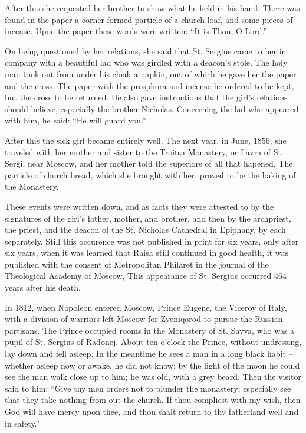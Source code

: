 After this she requested her brother to show what he held in his hand. There was found in the paper a corner-formed particle of a church loaf, and some pieces of incense. Upon the paper these words were written: ``It is Thou, O Lord.''

On being questioned by her relations, she said that St. Sergius came to her in company with a beautiful lad who was girdled with a deacon's stole. The holy man took out from under his cloak a napkin, out of which he gave her the paper and the cross. The paper with the prosphora and incense he ordered to be kept, but the cross to be returned. He also gave instructions that the girl's relations should believe, especially the brother Nicholas. Concerning the lad who appeared with him, he said: ``He will guard you.''

After this the sick girl became entirely well. The next year, in June, 1856, she traveled with her mother and sister to the Troitsa Monastery, or Lavra of St. Sergi, near Moscow, and her mother told the superiors of all that hapened. The particle of church bread, which she brought with her, proved to be the baking of the Monastery.

These events were written down, and as facts they were attested to by the signatures of the girl's father, mother, and brother, and then by the archpriest, the priest, and the deacon of the St. Nicholas Cathedral in Epiphany, by each separately. Still this occurence was not published in print for six years, only after six years, when it was learned that Raisa still continued in good health, it was published with the consent of Metropolitan Philaret in the journal of the Theological Academy of Moscow, This appearance of St. Sergius occurred 464 years after his death.

In 1812, when Napoleon entered Moscow, Prince Eugene, the Viceroy of Italy, with a division of warriors left Moscow for Zveniqorod to pursue the Russian partisans. The Prince occupied rooms in the Monastery of St. Savva, who was a pupil of St. Sergius of Radonej. About ten o'clock the Prince, without undressing, lay down and fell asleep. In the meantime he sees a man in a long black habit -- whether asleep now or awake, he did not know; by the light of the moon he could see the man walk close up to him; he was old, with a grey beard. Then the visitor said to him: ``Give thy men orders not to plunder the monastery; especially see that they take nothing from out the church. If thou compliest with my wish, then God will have mercy upon thee, and thou shalt return to thy fatherland well and in safety.''

